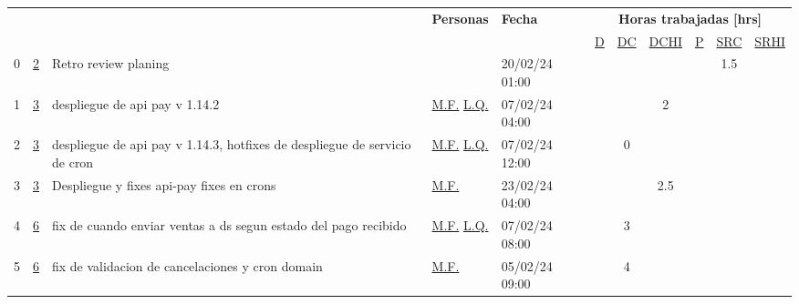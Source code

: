 \documentclass{article}
\begin{document}
\begin{longtable}{|m{0.5cm}|m{1.2cm}|p{5cm}|m{1.5cm}|m{1.5cm}||c|c|c|c|c|c|    |}
        \hline
        \multirow{2}{=}{\centering{\textbf{N°}}} & \multirow{2}{=}{\centering{\textbf{N°Hist}}} & \multirow{2}{=}{\centering{\textbf{Detalle Tarea}}}  & \multirow{2}{=}{\textbf{Personas}} & \multirow{2}{=}{\textbf{Fecha}} &   
        \multicolumn{6}{c|}{
            \textbf{Horas trabajadas [hrs]}
        } \\ 
        \hhline{~~~~~----}
        &&&&&  \hyperref[D]{\color{blue}D}  
&  \hyperref[DC]{\color{blue}DC}  
&  \hyperref[DCHI]{\color{blue}DCHI}  
&  \hyperref[P]{\color{blue}P}  
&  \hyperref[SRC]{\color{blue}SRC}  
&  \hyperref[SRHI]{\color{blue}SRHI}  
\\ \hline \hline
                 \label{0}0  &  \hyperref[2]{\color{blue}2}  & Retro review planing &  
                 & 20/02/24 01:00  &  &  &  &  & 1.5 & \\ \hline 

                 \label{1}1  &  \hyperref[3]{\color{blue}3}  & despliegue de api pay v 1.14.2 &  
                  \hyperref[M.F.]{\color{blue}M.F.} \newline  \hyperref[L.Q.]{\color{blue}L.Q.}  & 07/02/24 04:00  &  &  & 2 &  &  & \\ \hline 

                 \label{2}2  &  \hyperref[3]{\color{blue}3}  & despliegue de api pay v 1.14.3, hotfixes de despliegue de servicio de cron &  
                  \hyperref[M.F.]{\color{blue}M.F.} \newline  \hyperref[L.Q.]{\color{blue}L.Q.}  & 07/02/24 12:00  &  & 0 &  &  &  & \\ \hline 

                 \label{3}3  &  \hyperref[3]{\color{blue}3}  & Despliegue y fixes api-pay fixes en crons &  
                  \hyperref[M.F.]{\color{blue}M.F.}  & 23/02/24 04:00  &  &  & 2.5 &  &  & \\ \hline 

                 \label{4}4  &  \hyperref[6]{\color{blue}6}  & fix de cuando enviar ventas a ds segun estado del pago recibido &  
                  \hyperref[M.F.]{\color{blue}M.F.} \newline  \hyperref[L.Q.]{\color{blue}L.Q.}  & 07/02/24 08:00  &  & 3 &  &  &  & \\ \hline 

                 \label{5}5  &  \hyperref[6]{\color{blue}6}  & fix de validacion de cancelaciones y cron domain &  
                  \hyperref[M.F.]{\color{blue}M.F.}  & 05/02/24 09:00  &  & 4 &  &  &  & \\ \hline 


\end{longtable}
\end{document}
